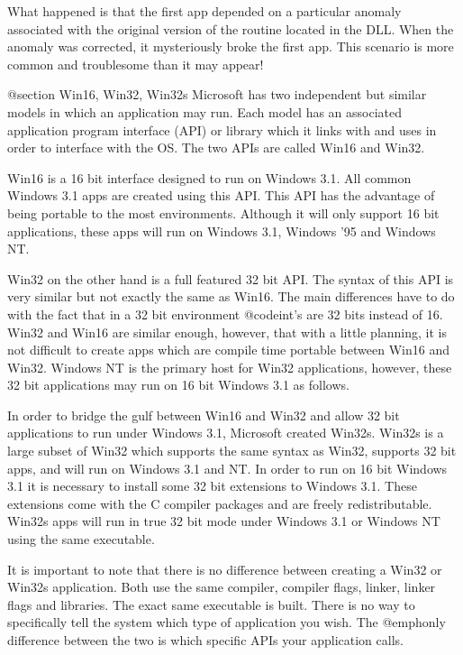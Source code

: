 What happened is that the first app depended on a particular anomaly
associated with the original version of the routine located in the DLL.
When the anomaly was corrected, it mysteriously broke the first app.
This scenario is more common and troublesome than it may appear!



@section Win16, Win32, Win32s
Microsoft has two independent but similar models in which an application
may run.  Each model has an associated application program interface
(API) or library which it links with and uses in order to interface with
the OS.  The two APIs are called Win16 and Win32.

Win16 is a 16 bit interface designed to run on Windows 3.1.  All common
Windows 3.1 apps are created using this API.  This API has the advantage
of being portable to the most environments.  Although it will only
support 16 bit applications, these apps will run on Windows 3.1, Windows
'95 and Windows NT.

Win32 on the other hand is a full featured 32 bit API.  The syntax of
this API is very similar but not exactly the same as Win16.  The main
differences have to do with the fact that in a 32 bit environment
@code{int}'s are 32 bits instead of 16.  Win32 and Win16 are similar
enough, however, that with a little planning, it is not difficult to
create apps which are compile time portable between Win16 and Win32.
Windows NT is the primary host for Win32 applications, however,
these 32 bit applications may run on 16 bit Windows 3.1 as follows.

In order to bridge the gulf between Win16 and Win32 and allow 32 bit
applications to run under Windows 3.1, Microsoft created Win32s.  Win32s
is a large subset of Win32 which supports the same syntax as Win32,
supports 32 bit apps, and will run on Windows 3.1 and NT.  In order to
run on 16 bit Windows 3.1 it is necessary to install some 32 bit
extensions to Windows 3.1.  These extensions come with the C compiler
packages and are freely redistributable.  Win32s apps will run in true
32 bit mode under Windows 3.1 or Windows NT using the same executable.

It is important to note that there is no difference between creating a
Win32 or Win32s application.  Both use the same compiler, compiler
flags, linker, linker flags and libraries.  The exact same executable
is built.  There is no way to specifically tell the system which type of
application you wish.  The @emph{only} difference between the two is
which specific APIs your application calls.

